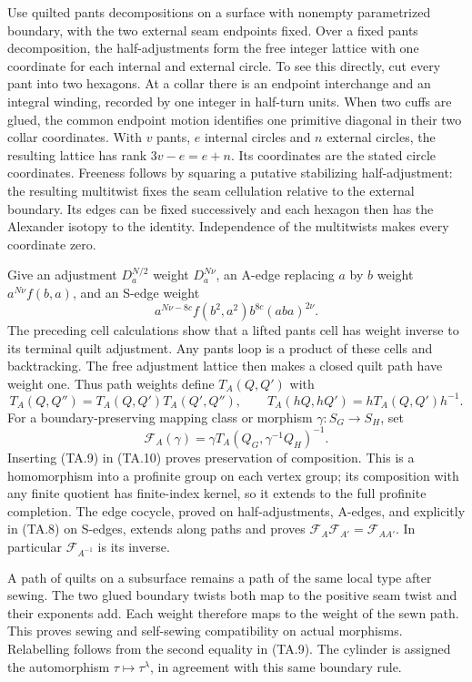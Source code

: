Use quilted pants decompositions on a surface with nonempty
parametrized boundary, with the two external seam endpoints fixed.
Over a fixed pants decomposition, the half-adjustments form the free
integer lattice with one coordinate for each internal and external
circle.  To see this directly, cut every pant into two hexagons.
At a collar there is an endpoint interchange and an integral winding,
recorded by one integer in half-turn units.  When two cuffs are glued,
the common endpoint motion identifies one primitive diagonal in their
two collar coordinates.  With $v$ pants, $e$ internal circles and
$n$ external circles, the resulting lattice has rank
$3v-e=e+n$.  Its coordinates are the stated circle coordinates.
Freeness follows by squaring a putative stabilizing half-adjustment:
the resulting multitwist fixes the seam cellulation relative to the
external boundary.  Its edges can be fixed successively and each
hexagon then has the Alexander isotopy to the identity.  Independence
of the multitwists makes every coordinate zero.

Give an adjustment $D_a^{N/2}$ weight $D_a^{N\nu}$, an A-edge
replacing $a$ by $b$ weight $a^{N\nu}f(b,a)$, and an S-edge weight
\[
        a^{N\nu-8c}f(b^2,a^2)b^{8c}(aba)^{2\nu}.
\]
The preceding cell calculations show that a lifted pants cell has
weight inverse to its terminal quilt adjustment.  Any pants loop is
a product of these cells and backtracking.  The free adjustment
lattice then makes a closed quilt path have weight one.  Thus path
weights define $T_A(Q,Q')$ with
\[
 T_A(Q,Q'')=T_A(Q,Q')T_A(Q',Q''),\qquad
 T_A(hQ,hQ')=hT_A(Q,Q')h^{-1}.                              \tag{TA.9}
\]
For a boundary-preserving mapping class or morphism
$\gamma:S_G\to S_H$, set
\[
       \mathcal F_A(\gamma)
       =\gamma T_A(Q_G,\gamma^{-1}Q_H)^{-1}.                \tag{TA.10}
\]
Inserting (TA.9) in (TA.10) proves preservation of composition.
This is a homomorphism into a profinite group on each vertex group;
its composition with any finite quotient has finite-index kernel,
so it extends to the full profinite completion.  The edge cocycle,
proved on half-adjustments, A-edges, and explicitly in (TA.8) on
S-edges, extends along paths and proves
$\mathcal F_A\mathcal F_{A'}=\mathcal F_{AA'}$.
In particular $\mathcal F_{A^{-1}}$ is its inverse.

A path of quilts on a subsurface remains a path of the same local type
after sewing.  The two glued boundary twists both map to the positive
seam twist and their exponents add.  Each weight therefore maps to the
weight of the sewn path.  This proves sewing and self-sewing compatibility
on actual morphisms.  Relabelling follows from the second equality
in (TA.9).  The cylinder is assigned the automorphism
$\tau\mapsto\tau^\lambda$, in agreement with this same boundary rule.

